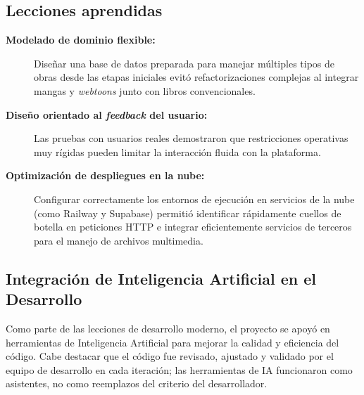 \documentclass[12pt, atypical, journal]{article}
\begin{document}
\subsection{Lecciones aprendidas}
\begin{description}
    \item[\textbf{Modelado de dominio flexible:}] 
    Diseñar una base de datos preparada para manejar múltiples tipos de obras desde las etapas iniciales evitó refactorizaciones complejas al integrar mangas y \textit{webtoons} junto con libros convencionales.
   
    \item[\textbf{Diseño orientado al \textit{feedback} del usuario:}] 
    Las pruebas con usuarios reales demostraron que restricciones operativas muy rígidas pueden limitar la interacción fluida con la plataforma.
   
    \item[\textbf{Optimización de despliegues en la nube:}] 
    Configurar correctamente los entornos de ejecución en servicios de la nube (como Railway y Supabase) permitió identificar rápidamente cuellos de botella en peticiones HTTP e integrar eficientemente servicios de terceros para el manejo de archivos multimedia.
\end{description}

\subsection{Integración de Inteligencia Artificial en el Desarrollo}
Como parte de las lecciones de desarrollo moderno, el proyecto se apoyó en herramientas de Inteligencia Artificial para mejorar la calidad y eficiencia del código. Cabe destacar que el código fue revisado, ajustado y validado por el equipo de desarrollo en cada iteración; las herramientas de IA funcionaron como asistentes, no como reemplazos del criterio del desarrollador.
\end{document}
